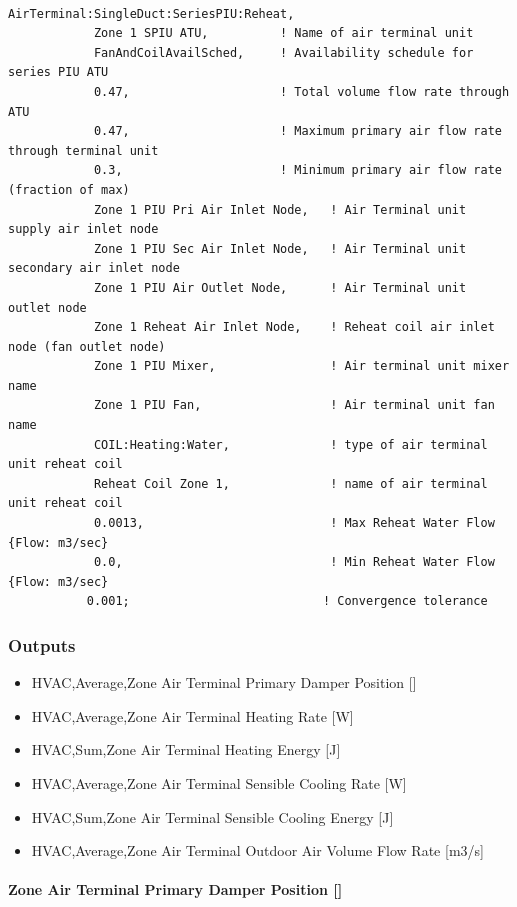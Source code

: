 \begin{lstlisting}

AirTerminal:SingleDuct:SeriesPIU:Reheat,
            Zone 1 SPIU ATU,          ! Name of air terminal unit
            FanAndCoilAvailSched,     ! Availability schedule for series PIU ATU
            0.47,                     ! Total volume flow rate through ATU
            0.47,                     ! Maximum primary air flow rate through terminal unit
            0.3,                      ! Minimum primary air flow rate (fraction of max)
            Zone 1 PIU Pri Air Inlet Node,   ! Air Terminal unit supply air inlet node
            Zone 1 PIU Sec Air Inlet Node,   ! Air Terminal unit secondary air inlet node
            Zone 1 PIU Air Outlet Node,      ! Air Terminal unit outlet node
            Zone 1 Reheat Air Inlet Node,    ! Reheat coil air inlet node (fan outlet node)
            Zone 1 PIU Mixer,                ! Air terminal unit mixer name
            Zone 1 PIU Fan,                  ! Air terminal unit fan name
            COIL:Heating:Water,              ! type of air terminal unit reheat coil
            Reheat Coil Zone 1,              ! name of air terminal unit reheat coil
            0.0013,                          ! Max Reheat Water Flow {Flow: m3/sec}
            0.0,                             ! Min Reheat Water Flow {Flow: m3/sec}
           0.001;                           ! Convergence tolerance
\end{lstlisting}

\subsubsection{Outputs}\label{outputs-7}

\begin{itemize}
\item
  HVAC,Average,Zone Air Terminal Primary Damper Position {[]}
\item
  HVAC,Average,Zone Air Terminal Heating Rate {[}W{]}
\item
  HVAC,Sum,Zone Air Terminal Heating Energy {[}J{]}
\item
  HVAC,Average,Zone Air Terminal Sensible Cooling Rate {[}W{]}
\item
  HVAC,Sum,Zone Air Terminal Sensible Cooling Energy {[}J{]}
\item
  HVAC,Average,Zone Air Terminal Outdoor Air Volume Flow Rate {[}m3/s{]}
\end{itemize}

\paragraph{Zone Air Terminal Primary Damper Position {[]}}\label{zone-air-terminal-series-piu-primary-damper-position}

